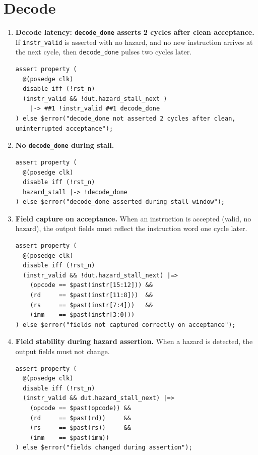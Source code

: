 \documentclass[11pt,a4paper]{article}
\begin{document}
\section{Decode}

\begin{enumerate}

\item \textbf{Decode latency: \texttt{decode\_done} asserts 2 cycles after clean acceptance.}
If \texttt{instr\_valid} is asserted with no hazard, and no new instruction arrives at the next cycle, then \texttt{decode\_done} pulses two cycles later.
\begin{lstlisting}
assert property (
  @(posedge clk)
  disable iff (!rst_n)
  (instr_valid && !dut.hazard_stall_next )
    |-> ##1 !instr_valid ##1 decode_done
) else $error("decode_done not asserted 2 cycles after clean, uninterrupted acceptance");
\end{lstlisting}

\item \textbf{No \texttt{decode\_done} during stall.}
\begin{lstlisting}
assert property (
  @(posedge clk)
  disable iff (!rst_n)
  hazard_stall |-> !decode_done
) else $error("decode_done asserted during stall window");
\end{lstlisting}

\item \textbf{Field capture on acceptance.}
When an instruction is accepted (valid, no hazard), the output fields must reflect the instruction word one cycle later.
\begin{lstlisting}
assert property (
  @(posedge clk)
  disable iff (!rst_n)
  (instr_valid && !dut.hazard_stall_next) |=>
    (opcode == $past(instr[15:12])) &&
    (rd     == $past(instr[11:8]))  &&
    (rs     == $past(instr[7:4]))   &&
    (imm    == $past(instr[3:0]))
) else $error("fields not captured correctly on acceptance");
\end{lstlisting}

\item \textbf{Field stability during hazard assertion.}
When a hazard is detected, the output fields must not change.
\begin{lstlisting}
assert property (
  @(posedge clk)
  disable iff (!rst_n)
  (instr_valid && dut.hazard_stall_next) |=>
    (opcode == $past(opcode)) &&
    (rd     == $past(rd))     &&
    (rs     == $past(rs))     &&
    (imm    == $past(imm))
) else $error("fields changed during assertion");
\end{lstlisting}


\end{enumerate}
\end{document}
